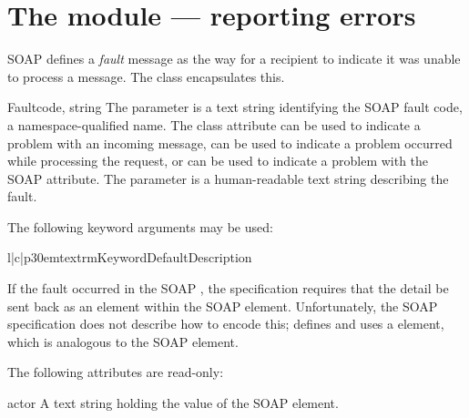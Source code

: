 \chapter{The  module --- reporting errors}

SOAP defines a \emph{fault} message as the way for a recipient to
indicate it was unable to process a message.
The \ZSI{}  class encapsulates this.

\begin{classdesc}{Fault}{code, string}
The  parameter is a text string identifying the SOAP fault
code, a namespace-qualified name.
The class attribute  can be used to indicate a problem with
an incoming message,  can be used to
indicate a problem occurred while processing the request, or 
can be used to indicate a problem with the SOAP 
attribute.
The  parameter is a human-readable text string describing the
fault.

The following keyword arguments may be used:

\begin{tableiii}{l|c|p{30em}}{textrm}{Keyword}{Default}{Description}
\end{tableiii}

If the fault occurred in the SOAP , the specification
requires that the detail be sent back as an element within
the SOAP  element.
Unfortunately, the SOAP specification does not describe how to encode
this; \ZSI{} defines and uses a
 element, which is analogous to the SOAP 
element.
\end{classdesc}

The following attributes are read-only:

\begin{memberdesc}{actor}
A text string holding the value of the SOAP  element.
\end{memberdesc}

